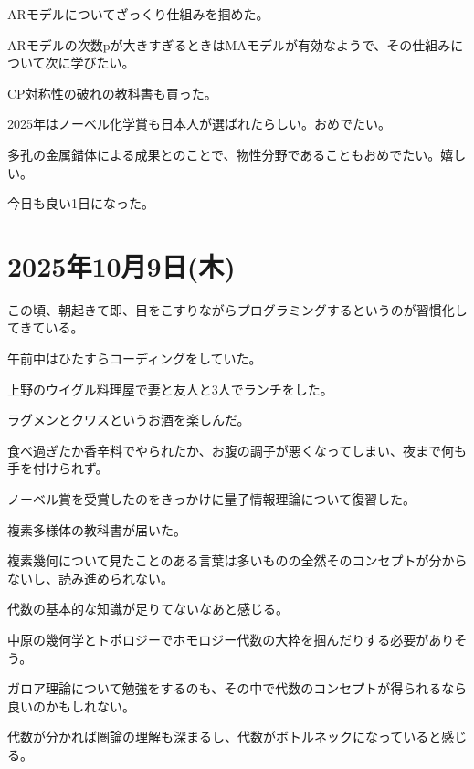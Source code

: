 \documentclass[uplatex]{jsarticle}
\begin{document}
ARモデルについてざっくり仕組みを掴めた。

ARモデルの次数pが大きすぎるときはMAモデルが有効なようで、その仕組みについて次に学びたい。

CP対称性の破れの教科書も買った。

2025年はノーベル化学賞も日本人が選ばれたらしい。おめでたい。

多孔の金属錯体による成果とのことで、物性分野であることもおめでたい。嬉しい。

今日も良い1日になった。


\section{2025年10月9日(木)}

この頃、朝起きて即、目をこすりながらプログラミングするというのが習慣化してきている。

午前中はひたすらコーディングをしていた。

上野のウイグル料理屋で妻と友人と3人でランチをした。

ラグメンとクワスというお酒を楽しんだ。

食べ過ぎたか香辛料でやられたか、お腹の調子が悪くなってしまい、夜まで何も手を付けられず。

ノーベル賞を受賞したのをきっかけに量子情報理論について復習した。

複素多様体の教科書が届いた。

複素幾何について見たことのある言葉は多いものの全然そのコンセプトが分からないし、読み進められない。

代数の基本的な知識が足りてないなあと感じる。

中原の幾何学とトポロジーでホモロジー代数の大枠を掴んだりする必要がありそう。

ガロア理論について勉強をするのも、その中で代数のコンセプトが得られるなら良いのかもしれない。

代数が分かれば圏論の理解も深まるし、代数がボトルネックになっていると感じる。
\end{document}
